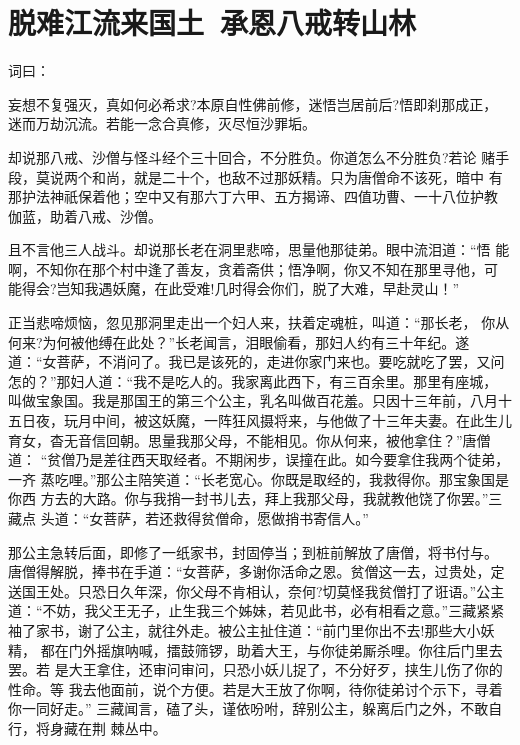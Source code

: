\chapter{脱难江流来国土~承恩八戒转山林}

词曰：

妄想不复强灭，真如何必希求?本原自性佛前修，迷悟岂居前后?悟即刹那成正，
迷而万劫沉流。若能一念合真修，灭尽恒沙罪垢。

却说那八戒、沙僧与怪斗经个三十回合，不分胜负。你道怎么不分胜负?若论
赌手段，莫说两个和尚，就是二十个，也敌不过那妖精。只为唐僧命不该死，暗中
有那护法神祇保着他；空中又有那六丁六甲、五方揭谛、四值功曹、一十八位护教
伽蓝，助着八戒、沙僧。

且不言他三人战斗。却说那长老在洞里悲啼，思量他那徒弟。眼中流泪道：“悟
能啊，不知你在那个村中逢了善友，贪着斋供；悟净啊，你又不知在那里寻他，可
能得会?岂知我遇妖魔，在此受难!几时得会你们，脱了大难，早赴灵山！”

正当悲啼烦恼，忽见那洞里走出一个妇人来，扶着定魂桩，叫道：“那长老，
你从何来?为何被他缚在此处？”长老闻言，泪眼偷看，那妇人约有三十年纪。遂
道：“女菩萨，不消问了。我已是该死的，走进你家门来也。要吃就吃了罢，又问
怎的？”那妇人道：“我不是吃人的。我家离此西下，有三百余里。那里有座城，
叫做宝象国。我是那国王的第三个公主，乳名叫做百花羞。只因十三年前，八月十
五日夜，玩月中间，被这妖魔，一阵狂风摄将来，与他做了十三年夫妻。在此生儿
育女，杳无音信回朝。思量我那父母，不能相见。你从何来，被他拿住？”唐僧道：
“贫僧乃是差往西天取经者。不期闲步，误撞在此。如今要拿住我两个徒弟，一齐
蒸吃哩。”那公主陪笑道：“长老宽心。你既是取经的，我救得你。那宝象国是你西
方去的大路。你与我捎一封书儿去，拜上我那父母，我就教他饶了你罢。”三藏点
头道：“女菩萨，若还救得贫僧命，愿做捎书寄信人。”

那公主急转后面，即修了一纸家书，封固停当；到桩前解放了唐僧，将书付与。
唐僧得解脱，捧书在手道：“女菩萨，多谢你活命之恩。贫僧这一去，过贵处，定
送国王处。只恐日久年深，你父母不肯相认，奈何?切莫怪我贫僧打了诳语。”公主
道：“不妨，我父王无子，止生我三个姊妹，若见此书，必有相看之意。”三藏紧紧
袖了家书，谢了公主，就往外走。被公主扯住道：“前门里你出不去!那些大小妖精，
都在门外摇旗呐喊，擂鼓筛锣，助着大王，与你徒弟厮杀哩。你往后门里去罢。若
是大王拿住，还审问审问，只恐小妖儿捉了，不分好歹，挟生儿伤了你的性命。等
我去他面前，说个方便。若是大王放了你啊，待你徒弟讨个示下，寻着你一同好走。”
三藏闻言，磕了头，谨依吩咐，辞别公主，躲离后门之外，不敢自行，将身藏在荆
棘丛中。

